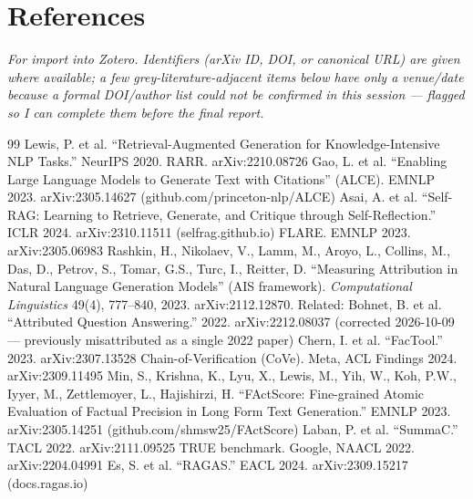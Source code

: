 \section*{References}

\textit{For import into Zotero. Identifiers (arXiv ID, DOI, or canonical URL) are given where available; a few grey-literature-adjacent items below have only a venue/date because a formal DOI/author list could not be confirmed in this session — flagged so I can complete them before the final report.}

\begin{thebibliography}{99}
 Lewis, P. et al. \textquotedblleft{}Retrieval-Augmented Generation for Knowledge-Intensive NLP Tasks.\textquotedblright{} NeurIPS 2020.
 RARR. arXiv:2210.08726
 Gao, L. et al. \textquotedblleft{}Enabling Large Language Models to Generate Text with Citations\textquotedblright{} (ALCE). EMNLP 2023. arXiv:2305.14627 (github.com/princeton-nlp/ALCE)
 Asai, A. et al. \textquotedblleft{}Self-RAG: Learning to Retrieve, Generate, and Critique through Self-Reflection.\textquotedblright{} ICLR 2024. arXiv:2310.11511 (selfrag.github.io)
 FLARE. EMNLP 2023. arXiv:2305.06983
 Rashkin, H., Nikolaev, V., Lamm, M., Aroyo, L., Collins, M., Das, D., Petrov, S., Tomar, G.S., Turc, I., Reitter, D. \textquotedblleft{}Measuring Attribution in Natural Language Generation Models\textquotedblright{} (AIS framework). \textit{Computational Linguistics} 49(4), 777–840, 2023. arXiv:2112.12870. Related: Bohnet, B. et al. \textquotedblleft{}Attributed Question Answering.\textquotedblright{} 2022. arXiv:2212.08037 (corrected 2026-10-09 — previously misattributed as a single 2022 paper)
 Chern, I. et al. \textquotedblleft{}FacTool.\textquotedblright{} 2023. arXiv:2307.13528
 Chain-of-Verification (CoVe). Meta, ACL Findings 2024. arXiv:2309.11495
 Min, S., Krishna, K., Lyu, X., Lewis, M., Yih, W., Koh, P.W., Iyyer, M., Zettlemoyer, L., Hajishirzi, H. \textquotedblleft{}FActScore: Fine-grained Atomic Evaluation of Factual Precision in Long Form Text Generation.\textquotedblright{} EMNLP 2023. arXiv:2305.14251 (github.com/shmsw25/FActScore)
 Laban, P. et al. \textquotedblleft{}SummaC.\textquotedblright{} TACL 2022. arXiv:2111.09525
 TRUE benchmark. Google, NAACL 2022. arXiv:2204.04991
 Es, S. et al. \textquotedblleft{}RAGAS.\textquotedblright{} EACL 2024. arXiv:2309.15217 (docs.ragas.io)

\end{thebibliography}

